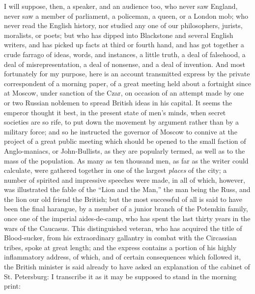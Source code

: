 I will suppose, then, a speaker, and an audience too,
who never saw England, never saw a member of parliament,
a policeman, a queen, or a London mob; who never read the
English history, nor studied any one of our philosophers,
jurists, moralists, or poets; but who has dipped into
Blackstone and several English writers, and has picked up
facts at third or fourth hand, and has got together a
crude farrago of ideas, words, and instances, a little
truth, a deal of falsehood, a deal of misrepresentation,
a deal of nonsense, and a deal of invention. And most
fortunately for my purpose, here is an account
transmitted express by the private correspondent of a
morning paper, of a great meeting held about a fortnight
since at Moscow, under sanction of the Czar, on occasion
of an attempt made by one or two Russian noblemen to
spread British ideas in his capital. It seems the emperor
thought it best, in the present state of men's minds,
when secret societies are so rife, to put down the
movement by argument rather than by a military force; and
so he instructed the governor of Moscow to connive at the
project of a great public meeting which should be opened
to the small faction of Anglo-maniacs, or John-Bullists,
as they are popularly termed, as well as to the mass of
the population. As many as ten thousand men, as far as
the writer could calculate, were gathered together in one
of the largest \emph{places} of the city; a number of
spirited and impressive speeches were made, in all of
which, however, was illustrated the fable of the
``Lion and the Man,'' the man being the Russ, and
the lion our old friend the British; but the most
successful of all is said to have been the final
harangue, by a member of a junior branch of the Potemkin
family, once one of the imperial aides-de-camp, who has
spent the last thirty years in the wars of the Caucasus.
This distinguished veteran, who has acquired the title of
Blood-sucker, from his extraordinary gallantry in combat
with the Circassian tribes, spoke at great length; and
the express contains a portion of his highly inflammatory
address, of which, and of certain consequences which
followed it, the British minister is said already to have
asked an explanation of the cabinet of St. Petersburg: I
transcribe it as it may be supposed to stand in the
morning print:

